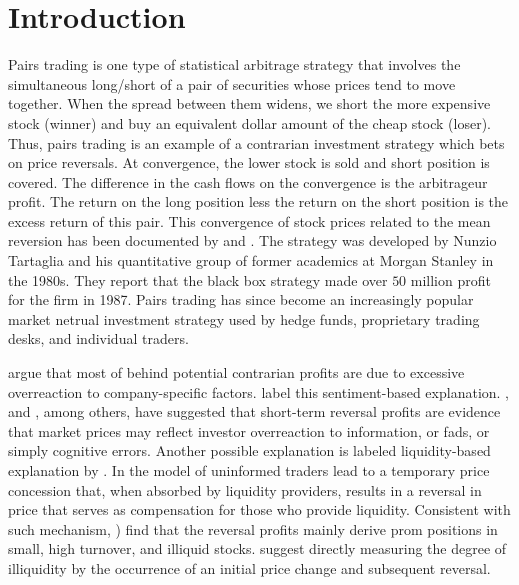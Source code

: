 	\section{Introduction}
	
	Pairs trading is one type of statistical arbitrage strategy that involves the simultaneous long/short of a pair of securities whose prices tend to move together. When the spread between them widens, we short the more expensive stock (winner) and buy an equivalent dollar amount of the cheap stock (loser). Thus, pairs trading is an example of a contrarian investment strategy which bets on price reversals. At convergence, the lower stock is sold and short position is covered. The difference in the cash flows on the convergence is the arbitrageur profit. The return on the long position less the return on the short position is the excess return of this pair. This convergence of stock prices related to the mean reversion has been documented by \citet*{de1985,de1987} and \citet*{jegade1993}. The strategy was developed by Nunzio Tartaglia and his quantitative group of former academics at Morgan Stanley in the 1980s. They report that the black box strategy made over $50$ million profit for the firm in 1987. Pairs trading has since become an increasingly popular market netrual investment strategy used by hedge funds, proprietary trading desks, and individual traders. 
	
	\citet*{jt95} argue that most of behind potential contrarian profits are due to excessive overreaction to company-specific factors. \citet*{da2013closer} label this sentiment-based explanation. \citet*{shiller1984,black1986,stiglitz1989,summers1989} , and \citet*{subra2005}, among others, have suggested that short-term reversal profits are evidence that market prices may reflect investor overreaction to information, or fads, or simply cognitive errors. Another possible explanation is labeled liquidity-based explanation by \citet*{da2013closer}. In the model of \citet*{campbell1993} uninformed traders lead to a temporary price concession that, when absorbed by liquidity providers, results in a reversal in price that serves as compensation for those who provide liquidity. Consistent with such mechanism, \citet*{avramov2006} ) find that the reversal profits mainly derive prom positions in small, high turnover, and illiquid stocks. \citet*{pastor2003} suggest directly measuring the degree of illiquidity by the occurrence of an initial price change and subsequent reversal. 

